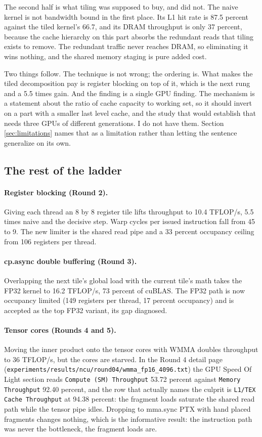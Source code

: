 The second half is what tiling was supposed to buy, and did not. The naive kernel
is not bandwidth bound in the first place. Its L1 hit rate is 87.5 percent against
the tiled kernel's 66.7, and its DRAM throughput is only 37 percent, because the
cache hierarchy on this part absorbs the redundant reads that tiling exists to
remove. The redundant traffic never reaches DRAM, so eliminating it wins nothing,
and the shared memory staging is pure added cost.

Two things follow. The technique is not wrong; the ordering is. What makes the
tiled decomposition pay is register blocking on top of it, which is the next rung
and a 5.5 times gain. And the finding is a single GPU finding. The mechanism is a
statement about the ratio of cache capacity to working set, so it should invert on
a part with a smaller last level cache, and the study that would establish that
needs three GPUs of different generations. I do not have them. Section
\ref{sec:limitations} names that as a limitation rather than letting the sentence
generalize on its own.

\subsection{The rest of the ladder}

\paragraph{Register blocking (Round 2).} Giving each thread an 8 by 8 register tile
lifts throughput to 10.4 TFLOP/s, 5.5 times naive and the decisive step. Warp
cycles per issued instruction fall from 45 to 9. The new limiter is the shared read
pipe and a 33 percent occupancy ceiling from 106 registers per thread.

\paragraph{cp.async double buffering (Round 3).} Overlapping the next tile's global
load with the current tile's math takes the FP32 kernel to 16.2 TFLOP/s, 73 percent
of cuBLAS. The FP32 path is now occupancy limited (149 registers per thread, 17
percent occupancy) and is accepted as the top FP32 variant, its gap diagnosed.

\paragraph{Tensor cores (Rounds 4 and 5).} Moving the inner product onto the tensor
cores with WMMA doubles throughput to 36 TFLOP/s, but the cores are starved. In the
Round 4 detail page (\texttt{experiments/results/ncu/round04/wmma\_fp16\_4096.txt})
the GPU Speed Of Light section reads \texttt{Compute (SM) Throughput} 53.72 percent
against \texttt{Memory Throughput} 92.40 percent, and the row that actually names
the culprit is \texttt{L1/TEX Cache Throughput} at 94.38 percent: the fragment loads
saturate the shared read path while the tensor pipe idles. Dropping to mma.sync PTX
with hand placed fragments changes nothing, which
is the informative result: the instruction path was never the bottleneck, the
fragment loads are.

